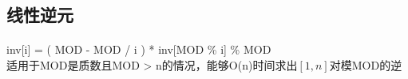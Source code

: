 ﻿\subsection{线性逆元}
\paragraph{}
inv[i] = ( MOD - MOD / i ) * inv[MOD \% i] \% MOD \\
适用于MOD是质数且MOD > n的情况，能够O(n)时间求出$ [1, n] $对模MOD的逆
